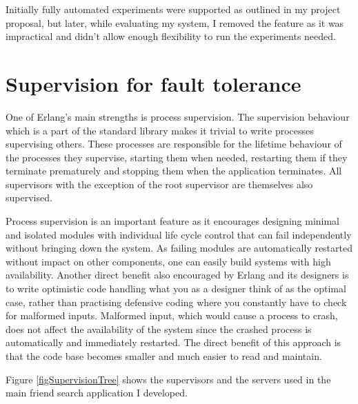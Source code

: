 Initially fully automated experiments were supported as outlined in my project proposal, but later, while evaluating my system, I removed the feature as it was impractical and didn't allow enough flexibility to run the experiments needed.

\section{Supervision for fault tolerance}
One of Erlang's main strengths is process supervision.
The supervision behaviour which is a part of the standard library makes it trivial to write processes supervising others. These processes are responsible for the lifetime behaviour of the processes they supervise, starting them when needed, restarting them if they terminate prematurely and stopping them when the application terminates. All supervisors with the exception of the root supervisor are themselves also supervised.

Process supervision is an important feature as it encourages designing minimal and isolated modules with individual life cycle control that can fail independently without bringing down the system. As failing modules are automatically restarted without impact on other components, one can easily build systems with high availability.
Another direct benefit also encouraged by Erlang and its designers is to write optimistic code handling what you as a designer think of as the optimal case, rather than practising defensive coding where you constantly have to check for malformed inputs. Malformed input, which would cause a process to crash, does not affect the availability of the system since the crashed process is automatically and immediately restarted. The direct benefit of this approach is that the code base becomes smaller and much easier to read and maintain.

Figure \ref{figSupervisionTree} shows the supervisors and the servers used in the main friend search application I developed.

